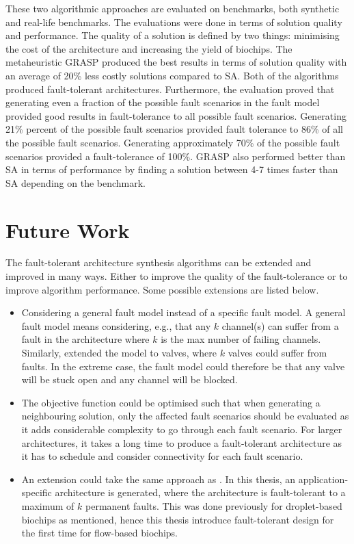 These two algorithmic approaches are evaluated on benchmarks, both synthetic and real-life benchmarks. The evaluations were done in terms of solution quality and performance. The quality of a solution is defined by two things: minimising the cost of the architecture and increasing the yield of biochips. The metaheuristic GRASP produced the best results in terms of solution quality with an average of 20\% less costly solutions compared to SA. Both of the algorithms produced fault-tolerant architectures. Furthermore, the evaluation proved that generating even a fraction of the possible fault scenarios in the fault model provided good results in fault-tolerance to all possible fault scenarios. Generating 21\% percent of the possible fault scenarios provided fault tolerance to 86\% of all the possible fault scenarios. Generating approximately 70\% of the possible fault scenarios provided a fault-tolerance of 100\%. GRASP also performed better than SA in terms of performance by finding a solution between 4-7 times faster than SA depending on the benchmark.

\section{Future Work}
The fault-tolerant architecture synthesis algorithms can be extended and improved in many ways. Either to improve the quality of the fault-tolerance or to improve algorithm performance. Some possible extensions are listed below.


\begin{itemize}
\item Considering a general fault model instead of a specific fault model. A general fault model means considering, e.g., that any $k$ channel(s) can suffer from a fault in the architecture where $k$ is the max number of failing channels. Similarly, extended the model to valves, where $k$ valves could suffer from faults. In the extreme case, the fault model could therefore be that any valve will be stuck open and any channel will be blocked.

\item The objective function could be optimised such that when generating a neighbouring solution, only the affected fault scenarios should be evaluated as it adds considerable complexity to go through each fault scenario. For larger architectures, it takes a long time to produce a fault-tolerant architecture as it has to schedule and consider connectivity for each fault scenario.

\item An extension could take the same approach as \cite{mirela}. In this thesis, an application-specific architecture is generated, where the architecture is fault-tolerant to a maximum of $k$ permanent faults. This was done previously for droplet-based biochips as mentioned, hence this thesis introduce fault-tolerant design for the first time for flow-based biochips.

\end{itemize}
